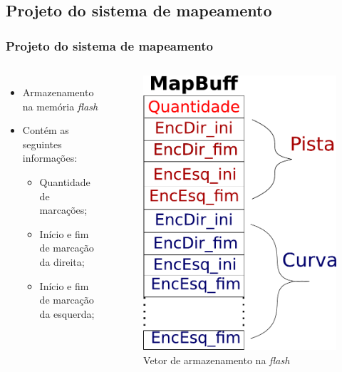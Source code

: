 \subsection{Projeto do sistema de mapeamento}

\begin{frame}
\frametitle{Projeto do sistema de mapeamento}
\begin{columns}
		\begin{itemize}
		\item Armazenamento na memória \textit{flash}
		\item Contém as seguintes informações:
			\begin{itemize}
			\item Quantidade de marcações;
			\item Início e fim de marcação da direita;
			\item Início e fim de marcação da esquerda;
			\end{itemize}
		\end{itemize}
		\begin{figure}[th]
		\centering
		\captionsetup{width=\textwidth,font=footnotesize,textfont=bf}
		\includegraphics[width=0.6\linewidth,keepaspectratio]{Figuras/VetorMap.pdf}
		\caption{Vetor de armazenamento na \textit{flash}}				
		\end{figure}
\end{columns}

\end{frame}

